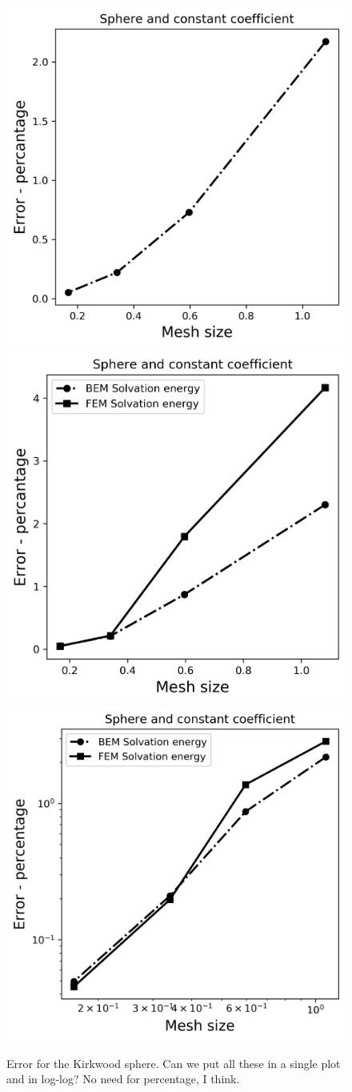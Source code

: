 \begin{figure}
  \centering
  \includegraphics[width=0.45\linewidth]{BEM_BEM_Sphere_const_coeff_error.png}
  \includegraphics[width=0.45\linewidth]{FEM_BEM_Sphere_const_coeff_error.png}
  \includegraphics[width=0.45\linewidth]{Hybrid_FEM_BEM_Sphere_const_coeff_error.png}
  \caption{Error for the Kirkwood sphere. Can we put all these in a single plot and in log-log? No need for percentage, I think.}
  \label{fig:error_sphere}
\end{figure}

